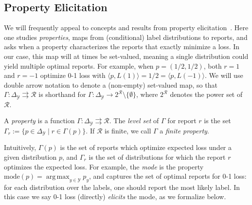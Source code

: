 \documentclass[twoside,11pt]{article}
\newcommand{\Comments}{1}
\newcommand{\mytodo}[2]{\ifnum\Comments=1%
  \todo[linecolor=#1!80!black,backgroundcolor=#1,bordercolor=#1!80!black]{#2}\fi}
\newcommand{\raft}[1]{\mytodo{green!20!white}{RF: #1}}
\newcommand{\jessiet}[1]{\mytodo{teal!20!white}{JF: #1}}
\newcommand{\mode}{\mathrm{mode}}
\newcommand{\simplex}{\Delta_\Y}
\newcommand{\R}{\mathcal{R}}
\newcommand{\Y}{\mathcal{Y}}
\newcommand{\inprod}[2]{\langle #1, #2 \rangle}%
\newcommand{\toto}{\rightrightarrows}
\DeclareMathOperator*{\argmax}{arg\,max}
\begin{document}
\subsection{Property Elicitation}
\label{sec:property-elicitation}

We will frequently appeal to concepts and results from property elicitation~\citep{savage1971elicitation,osband1985information-eliciting,lambert2008eliciting,gneiting2011making,steinwart2014elicitation,frongillo2015vector-valued,lambert2018elicitation}.
Here one studies \emph{properties}, maps from (conditional) label distributions to reports, and asks when a property characterizes the reports that exactly minimize a loss.
In our case, this map will at times be set-valued, meaning a single distribution could yield multiple optimal reports.
For example, when $p=(1/2,1/2)$, both $r=1$ and $r=-1$ optimize 0-1 loss with $\inprod{p}{L(1)} = 1/2 = \inprod{p}{L(-1)}$.
We will use double arrow notation to denote a (non-empty) set-valued map, so that $\Gamma: \simplex \toto \R$ is shorthand for $\Gamma: \simplex \to 2^{\R} \setminus \{\emptyset\}$, where $2^\R$ denotes the power set of $\R$.

\begin{definition}\label{def:property}
  A \emph{property} is a function $\Gamma:\simplex\toto\R$.
  The \emph{level set} of $\Gamma$ for report $r$ is the set $\Gamma_r := \{p \in \simplex \mid r \in \Gamma(p)\}$.
  If $\R$ is finite, we call $\Gamma$ a \emph{finite property}.
\end{definition}

Intuitively, $\Gamma(p)$ is the set of reports which optimize expected loss under a given distribution $p$, and $\Gamma_r$ is the set of distributions for which the report $r$ optimizes the expected loss.
For example, the \emph{mode} is the %
property $\mode(p) = \argmax_{y\in\Y} p_y$, and captures the set of optimal reports for 0-1 loss: for each distribution over the labels, one should report the most likely label.
In this case we say 0-1 loss (directly) \emph{elicits} the mode, as we formalize below.
\end{document}
